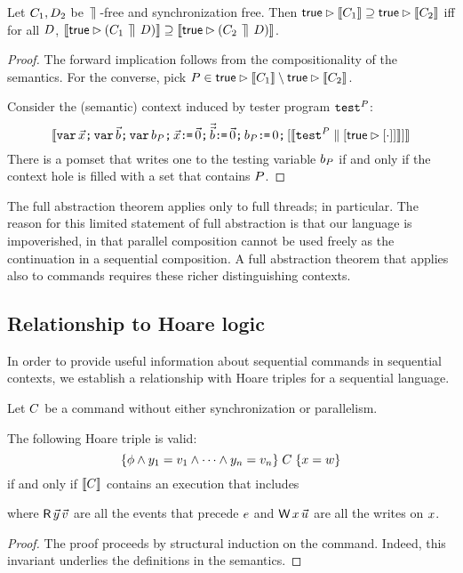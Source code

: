 \begin{theorem}
Let $C_1, D_2$ be $\,\mathbin{\rrceil}\,$-free and synchronization free.  Then $\mathsf{true}\mathbin\rhd \llbracket C_1\rrbracket  \supseteq \mathsf{true}\mathbin\rhd \llbracket C_2\rrbracket$ iff for all $D$,  $\llbracket\mathsf{true}\mathbin\rhd(C_1\,\mathbin{\rrceil}\, D)\rrbracket  \supseteq \llbracket\mathsf{true} \mathbin\rhd (C_2 \,\mathbin{\rrceil}\, D)\rrbracket$.

\begin{proof}
The forward implication follows from the compositionality of the semantics. For the converse, pick $P \in \mathsf{true}\mathbin\rhd \llbracket C_1\rrbracket \setminus \mathsf{true}\mathbin\rhd \llbracket C_2\rrbracket $. 

Consider the (semantic) context induced by tester program ${\tt test}^{P}_{}$:
\[ \llbracket\texttt{var}\,\vec{x}\texttt{;}\, \texttt{var}\,\vec{b} \texttt{;}\, \texttt{var}\, b_{P} \texttt{;}\,
    \vec{x}\texttt{:}\mkern-1mu\texttt{=}\,\vec{0}\texttt{;}\,
    \vec{\vec{b}}\texttt{:}\mkern-1mu\texttt{=}\,\vec{0} 
    \texttt{;}\, b_{P}\texttt{:}\mkern-1mu\texttt{=}\, 0 \texttt{;}\,  [\llbracket{\tt test}^{P}_{} \parallel [\mathsf{true} \mathbin\rhd [\cdot]]\rrbracket]\rrbracket
\]
There is a pomset that writes one to the  testing variable $b_{P}$ if and only if the context hole is filled with a set that contains $P$.  
\end{proof}
\end{theorem}

The full abstraction theorem applies only to full threads; in particular.  The reason for this limited statement of full abstraction is that our language is impoverished, in that parallel composition cannot be used freely as the continuation in a sequential composition.  A full abstraction theorem that applies also to commands requires these richer distinguishing contexts.  


\subsection{Relationship to Hoare logic}
In order to provide useful information about sequential commands in sequential contexts, we establish a relationship with Hoare triples for a sequential language.  

\begin{theorem}
Let $C$ be a command without either synchronization or parallelism.

The following Hoare triple is valid:
\begin{displaymath}
  \{\phi\land y_1=v_1\land\cdots\land y_n=v_n\}\;C\;\{x=w\}  
\end{displaymath}
if and only if $\llbracket C\rrbracket$ contains an execution that includes
\begin{tikzdisplay}[node distance=1em]
\end{tikzdisplay}
where $\DR{\vec{\bLoc}}{\vec{\aVal}}$ are all the events that precede $e$ and
$\DW{\aLoc}{\vec{\dVal}}$ are all the writes on $x$.
\begin{proof}
The proof proceeds by structural induction on the command.  Indeed, this invariant underlies the definitions in the semantics.
\end{proof}
\end{theorem}

